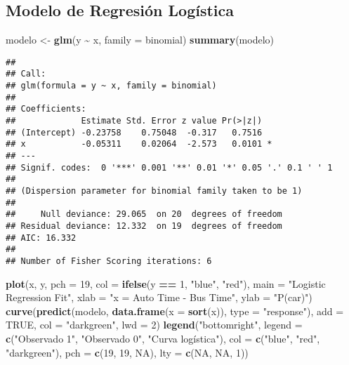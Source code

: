 \documentclass[
]{article}
\newenvironment{Shaded}{\begin{snugshade}}{\end{snugshade}}
\newcommand{\AttributeTok}[1]{\textcolor[rgb]{0.13,0.29,0.53}{#1}}
\newcommand{\ConstantTok}[1]{\textcolor[rgb]{0.56,0.35,0.01}{#1}}
\newcommand{\DecValTok}[1]{\textcolor[rgb]{0.00,0.00,0.81}{#1}}
\newcommand{\FunctionTok}[1]{\textcolor[rgb]{0.13,0.29,0.53}{\textbf{#1}}}
\newcommand{\NormalTok}[1]{#1}
\newcommand{\OtherTok}[1]{\textcolor[rgb]{0.56,0.35,0.01}{#1}}
\newcommand{\SpecialCharTok}[1]{\textcolor[rgb]{0.81,0.36,0.00}{\textbf{#1}}}
\newcommand{\StringTok}[1]{\textcolor[rgb]{0.31,0.60,0.02}{#1}}
\begin{document}
\subsection{Modelo de Regresión
Logística}\label{modelo-de-regresiuxf3n-loguxedstica}

\begin{Shaded}
\begin{Highlighting}[]
\NormalTok{modelo }\OtherTok{\textless{}{-}} \FunctionTok{glm}\NormalTok{(y }\SpecialCharTok{\textasciitilde{}}\NormalTok{ x, }\AttributeTok{family =}\NormalTok{ binomial)}
\FunctionTok{summary}\NormalTok{(modelo)}
\end{Highlighting}
\end{Shaded}

\begin{verbatim}
## 
## Call:
## glm(formula = y ~ x, family = binomial)
## 
## Coefficients:
##             Estimate Std. Error z value Pr(>|z|)  
## (Intercept) -0.23758    0.75048  -0.317   0.7516  
## x           -0.05311    0.02064  -2.573   0.0101 *
## ---
## Signif. codes:  0 '***' 0.001 '**' 0.01 '*' 0.05 '.' 0.1 ' ' 1
## 
## (Dispersion parameter for binomial family taken to be 1)
## 
##     Null deviance: 29.065  on 20  degrees of freedom
## Residual deviance: 12.332  on 19  degrees of freedom
## AIC: 16.332
## 
## Number of Fisher Scoring iterations: 6
\end{verbatim}

\begin{Shaded}
\begin{Highlighting}[]
\FunctionTok{plot}\NormalTok{(x, y, }\AttributeTok{pch =} \DecValTok{19}\NormalTok{, }\AttributeTok{col =} \FunctionTok{ifelse}\NormalTok{(y }\SpecialCharTok{==} \DecValTok{1}\NormalTok{, }\StringTok{"blue"}\NormalTok{, }\StringTok{"red"}\NormalTok{),}
     \AttributeTok{main =} \StringTok{"Logistic Regression Fit"}\NormalTok{, }\AttributeTok{xlab =} \StringTok{"x = Auto Time {-} Bus Time"}\NormalTok{, }\AttributeTok{ylab =} \StringTok{"P(car)"}\NormalTok{)}
\FunctionTok{curve}\NormalTok{(}\FunctionTok{predict}\NormalTok{(modelo, }\FunctionTok{data.frame}\NormalTok{(}\AttributeTok{x =} \FunctionTok{sort}\NormalTok{(x)), }\AttributeTok{type =} \StringTok{"response"}\NormalTok{),}
      \AttributeTok{add =} \ConstantTok{TRUE}\NormalTok{, }\AttributeTok{col =} \StringTok{"darkgreen"}\NormalTok{, }\AttributeTok{lwd =} \DecValTok{2}\NormalTok{)}
\FunctionTok{legend}\NormalTok{(}\StringTok{"bottomright"}\NormalTok{, }\AttributeTok{legend =} \FunctionTok{c}\NormalTok{(}\StringTok{"Observado 1"}\NormalTok{, }\StringTok{"Observado 0"}\NormalTok{, }\StringTok{"Curva logística"}\NormalTok{),}
       \AttributeTok{col =} \FunctionTok{c}\NormalTok{(}\StringTok{"blue"}\NormalTok{, }\StringTok{"red"}\NormalTok{, }\StringTok{"darkgreen"}\NormalTok{), }\AttributeTok{pch =} \FunctionTok{c}\NormalTok{(}\DecValTok{19}\NormalTok{, }\DecValTok{19}\NormalTok{, }\ConstantTok{NA}\NormalTok{), }\AttributeTok{lty =} \FunctionTok{c}\NormalTok{(}\ConstantTok{NA}\NormalTok{, }\ConstantTok{NA}\NormalTok{, }\DecValTok{1}\NormalTok{))}
\end{Highlighting}
\end{Shaded}
\end{document}
